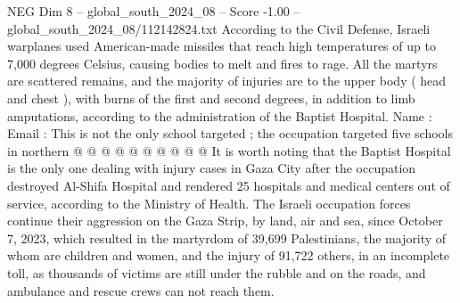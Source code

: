 \begin{textsample}{NEG Dim 8 – global\_south\_2024\_08 – Score -1.00 – global\_south\_2024\_08/112142824.txt}
According to the Civil Defense, Israeli warplanes used American-made missiles that reach high temperatures of up to 7,000 degrees Celsius, causing bodies to melt and fires to rage.
All the martyrs are scattered remains, and the majority of injuries are to the upper body ( head and chest ), with burns of the first and second degrees, in addition to limb amputations, according to the administration of the Baptist Hospital.
Name : Email : This is not the only school targeted ; the occupation targeted five schools in northern @ @ @ @ @ @ @ @ @ @ It is worth noting that the Baptist Hospital is the only one dealing with injury cases in Gaza City after the occupation destroyed Al-Shifa Hospital and rendered 25 hospitals and medical centers out of service, according to the Ministry of Health.
The Israeli occupation forces continue their aggression on the Gaza Strip, by land, air and sea, since October 7, 2023, which resulted in the martyrdom of 39,699 Palestinians, the majority of whom are children and women, and the injury of 91,722 others, in an incomplete toll, as thousands of victims are still under the rubble and on the roads, and ambulance and rescue crews can not reach them.

\end{textsample}

